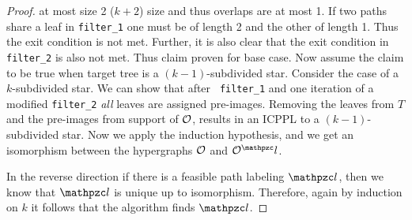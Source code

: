 \begin{proof}
  at most size 2 ($k+2$) size and thus overlaps are at most 1. If two
  paths share a leaf in {\tt filter\_1} one must be of length 2 and
  the other of length 1. Thus the exit condition is not met. Further,
  it is also clear that the exit condition in {\tt filter\_2} is also
  not met. Thus claim proven for base case.  Now assume the claim to
  be true when target tree is a $(k-1)$-subdivided star. Consider the
  case of a $k$-subdivided star.  We can show that after {\tt
    filter\_1} and one iteration of a modified {\tt filter\_2} {\em
    all} leaves are assigned pre-images.  Removing the leaves from $T$
  and the pre-images from support of ${\cal O}$, results in an ICPPL to a
  $(k-1)$-subdivided star.  Now we apply the induction hypothesis, and
  we get an isomorphism between the hypergraphs ${\cal O}$ and $\cO^\cl$.

  \noindent
  In the reverse direction if there is a feasible path labeling $\cl$,
  then we know that $\cl$ is unique up to isomorphism.  Therefore,
  again by induction on $k$ it follows that the algorithm finds $\cl$.
  
\end{proof}


%
%




